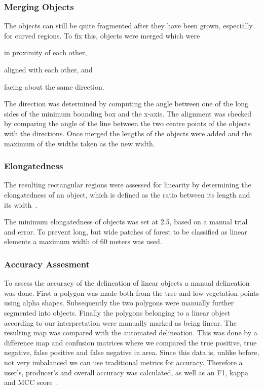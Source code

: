 {\subsubsection{Merging Objects}
The objects can still be quite fragmented after they have been grown, especially for curved regions. To fix this, objects were merged which were
\begin{enumerate*}[(i)]
	\item in proximity of each other,
	\item aligned with each other, and
	\item facing about the same direction.
\end{enumerate*}
The direction was determined by computing the angle between one of the long sides of the minimum bounding box and the x-axis. The alignment was checked by comparing the angle of the line between the two centre points of the objects with the directions. Once merged the lengths of the objects were added and the maximum of the widths taken as the new width.

\subsubsection{Elongatedness}
The resulting rectangular regions were assessed for linearity by determining the elongatedness of an object, which is defined as the ratio between its length and its width~\citep{nagao2013structural}. 

The minimum elongatedness of objects was set at 2.5, based on a manual trial and error. To prevent long, but wide patches of forest to be classified as linear elements a maximum width of 60 meters was used.

\subsubsection{Accuracy Assesment}
To assess the accuracy of the delineation of linear objects a manual delineation was done. First a polygon was made both from the tree and low vegetation points using alpha shapes. Subsequently the two polygons were manually further segmented into objects. Finally the polygons belonging to a linear object according to our interpretation were manually marked as being linear. The resulting map was compared with the automated delineation. This was done by a difference map and confusion matrices where we compared the true positive, true negative, false positive and false negative in area. Since this data is, unlike before, not very imbalanced we can use traditional metrics for accuracy. Therefore a user's, producer's and overall accuracy was calculated, as well as an F1, kappa and MCC score~\citep{congalton2008assessing}.

}

